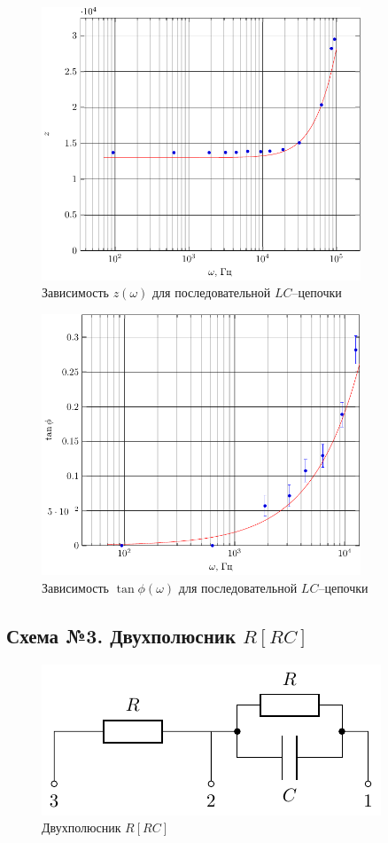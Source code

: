 
\begin{figure}[H]
	\centering
	\includegraphics[width=0.85\textwidth]{img/chem2_z}
	\caption{Зависимость $z(\omega)$ для последовательной $LC$--цепочки}
	\label{fig:LC_z}
\end{figure}
\begin{figure}[H]
	\centering
	\includegraphics[width=0.85\textwidth]{img/chem2_phi} 
	\caption{Зависимость $\tan\phi(\omega)$ для последовательной $LC$--цепочки}
	\label{fig:LC_tanphi}
\end{figure}

\subsection{Схема №3. Двухполюсник $R[RC]$}
\begin{figure}[H]
	\centering
	\includegraphics[]{chems/chem3}
	\caption{Двухполюсник $R[RC]$}
	\label{fig:RRC}
\end{figure}

